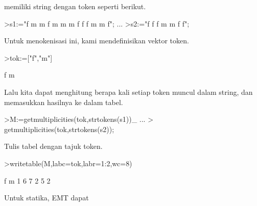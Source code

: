 \documentclass[a4paper,10pt]{article}
\begin{document}
\begin{eulernotebook}
\begin{eulercomment}
\begin{eulercomment}
\begin{eulercomment}
\begin{eulercomment}
\begin{eulercomment}
\begin{eulercomment}
\begin{eulercomment}
\begin{eulercomment}
\begin{eulercomment}
\begin{eulercomment}
\begin{eulercomment}
\begin{eulercomment}
\begin{eulercomment}
\begin{eulercomment}
\begin{eulercomment}
\begin{eulercomment}
\begin{eulercomment}
\begin{eulercomment}
\begin{eulercomment}
\begin{eulercomment}
\begin{eulercomment}
\begin{eulercomment}
\begin{eulercomment}
\begin{eulercomment}
\begin{eulercomment}
\begin{eulercomment}
\begin{eulercomment}
\begin{eulercomment}
\begin{eulercomment}
\begin{eulercomment}
\begin{eulercomment}
\begin{eulercomment}
\begin{eulercomment}
\begin{eulercomment}
\begin{eulercomment}
\begin{eulercomment}
\begin{eulercomment}
\begin{eulercomment}
\begin{eulercomment}
\begin{eulercomment}
\begin{eulercomment}
\begin{eulercomment}
\begin{eulercomment}
\begin{eulercomment}
\begin{eulercomment}
\begin{eulercomment}
\begin{eulercomment}
\begin{eulercomment}
\begin{eulercomment}
\begin{eulercomment}
\begin{eulercomment}
\begin{eulercomment}
\begin{eulercomment}
\begin{eulercomment}
\begin{eulercomment}
\begin{eulercomment}
\begin{eulercomment}
\begin{eulercomment}
\begin{eulercomment}
\begin{eulercomment}
\begin{eulercomment}
\begin{eulercomment}
\begin{eulercomment}
\begin{eulercomment}
\begin{eulercomment}
\begin{eulercomment}
\begin{eulercomment}
\begin{eulercomment}
\begin{eulercomment}
\begin{eulercomment}
\begin{eulercomment}
memiliki string dengan token seperti berikut.
\end{eulercomment}
\begin{eulerprompt}
>s1:="f m m f m m m f f f m m f";  ...
>s2:="f f f m m f f";
\end{eulerprompt}
\begin{eulercomment}
Untuk menokenisasi ini, kami mendefinisikan vektor token.
\end{eulercomment}
\begin{eulerprompt}
>tok:=["f","m"]
\end{eulerprompt}
\begin{euleroutput}
  f
  m
\end{euleroutput}
\begin{eulercomment}
Lalu kita dapat menghitung berapa kali setiap token muncul dalam
string, dan memasukkan hasilnya ke dalam tabel.
\end{eulercomment}
\begin{eulerprompt}
>M:=getmultiplicities(tok,strtokens(s1))_ ...
>  getmultiplicities(tok,strtokens(s2));
\end{eulerprompt}
\begin{eulercomment}
Tulis tabel dengan tajuk token.
\end{eulercomment}
\begin{eulerprompt}
>writetable(M,labc=tok,labr=1:2,wc=8)
\end{eulerprompt}
\begin{euleroutput}
                 f       m
         1       6       7
         2       5       2
\end{euleroutput}
\begin{eulercomment}
Untuk statika, EMT dapat 
\end{eulercomment}
\end{eulercomment}
\end{eulercomment}
\end{eulercomment}
\end{eulercomment}
\end{eulercomment}
\end{eulercomment}
\end{eulercomment}
\end{eulercomment}
\end{eulercomment}
\end{eulercomment}
\end{eulercomment}
\end{eulercomment}
\end{eulercomment}
\end{eulercomment}
\end{eulercomment}
\end{eulercomment}
\end{eulercomment}
\end{eulercomment}
\end{eulercomment}
\end{eulercomment}
\end{eulercomment}
\end{eulercomment}
\end{eulercomment}
\end{eulercomment}
\end{eulercomment}
\end{eulercomment}
\end{eulercomment}
\end{eulercomment}
\end{eulercomment}
\end{eulercomment}
\end{eulercomment}
\end{eulercomment}
\end{eulercomment}
\end{eulercomment}
\end{eulercomment}
\end{eulercomment}
\end{eulercomment}
\end{eulercomment}
\end{eulercomment}
\end{eulercomment}
\end{eulercomment}
\end{eulercomment}
\end{eulercomment}
\end{eulercomment}
\end{eulercomment}
\end{eulercomment}
\end{eulercomment}
\end{eulercomment}
\end{eulercomment}
\end{eulercomment}
\end{eulercomment}
\end{eulercomment}
\end{eulercomment}
\end{eulercomment}
\end{eulercomment}
\end{eulercomment}
\end{eulercomment}
\end{eulercomment}
\end{eulercomment}
\end{eulercomment}
\end{eulercomment}
\end{eulercomment}
\end{eulercomment}
\end{eulercomment}
\end{eulercomment}
\end{eulercomment}
\end{eulercomment}
\end{eulercomment}
\end{eulercomment}
\end{eulercomment}
\end{eulernotebook}
\end{document}
